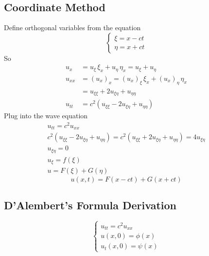 \documentclass[12pt]{article}
\begin{document}
\subsection{Coordinate Method}
Define orthogonal variables from the equation
\[\begin{cases}
    \xi = x - ct\\
    \eta = x + ct
\end{cases}\]
So 
\begin{align*}
    u_x &= u_\xi \, \xi_x + u_\eta \, \eta_x = u_\xi + u_\eta\\
    u_{xx} &= (u_x)_x = (u_x)_{\xi} \, \xi_x + (u_x)_\eta \, \eta_x\\
    &= u_{\xi \xi} + 2u_{\xi \eta} + u_{\eta \eta}\\
    u_{tt} &= c^2(u_{\xi \xi} - 2u_{\xi \eta} + u_{\eta \eta})
\end{align*}
Plug into the wave equation 
\begin{gather*}
    u_{tt} = c^2 u_{xx}\\
    c^2(u_{\xi \xi} - 2u_{\xi \eta} + u_{\eta \eta}) = c^2(u_{\xi \xi} + 2u_{\xi \eta} + u_{\eta \eta}) = 4u_{\xi \eta}\\
    u_{\xi \eta} = 0\\
    u_\xi = f(\xi)\\
    u = F(\xi) + G(\eta)
\end{gather*}
\[\boxed{u(x, t) = F(x - ct) + G(x + ct)}\]

\subsection{D'Alembert's Formula Derivation}
\[\begin{cases}
    u_{tt} = c^2 u_{xx}\\
    u(x, 0) = \phi(x)\\
    u_t(x, 0) = \psi(x)
\end{cases}\]
\end{document}
